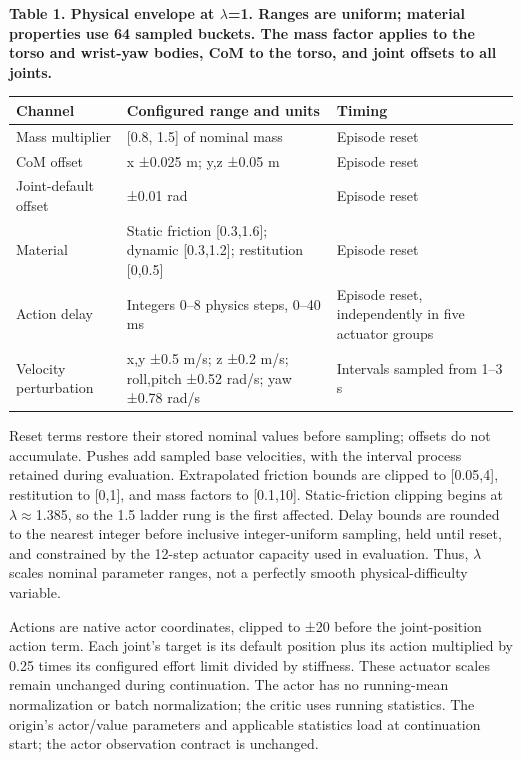 \documentclass[letterpaper,10pt,conference]{ieeeconf}
\begin{document}
\begin{table}[t]\small
\textbf{Table 1. Physical envelope at $\lambda$=1. Ranges are uniform; material properties use 64 sampled buckets. The mass factor applies to the torso and wrist-yaw bodies, CoM to the torso, and joint offsets to all joints.}\par\medskip
\begin{tabularx}{\linewidth}{XXX}\hline
Channel & Configured range and units & Timing \\\hline
Mass multiplier & [0.8, 1.5] of nominal mass & Episode reset \\
CoM offset & x ±0.025 m; y,z ±0.05 m & Episode reset \\
Joint-default offset & ±0.01 rad & Episode reset \\
Material & Static friction [0.3,1.6]; dynamic [0.3,1.2]; restitution [0,0.5] & Episode reset \\
Action delay & Integers 0--8 physics steps, 0--40 ms & Episode reset, independently in five actuator groups \\
Velocity perturbation & x,y ±0.5 m/s; z ±0.2 m/s; roll,pitch ±0.52 rad/s; yaw ±0.78 rad/s & Intervals sampled from 1--3 s \\
\hline\end{tabularx}\end{table}

Reset terms restore their stored nominal values before sampling; offsets do not accumulate. Pushes add sampled base velocities, with the interval process retained during evaluation. Extrapolated friction bounds are clipped to [0.05,4], restitution to [0,1], and mass factors to [0.1,10]. Static-friction clipping begins at $\lambda$$\approx$1.385, so the 1.5 ladder rung is the first affected. Delay bounds are rounded to the nearest integer before inclusive integer-uniform sampling, held until reset, and constrained by the 12-step actuator capacity used in evaluation. Thus, $\lambda$ scales nominal parameter ranges, not a perfectly smooth physical-difficulty variable.

Actions are native actor coordinates, clipped to ±20 before the joint-position action term. Each joint's target is its default position plus its action multiplied by 0.25 times its configured effort limit divided by stiffness. These actuator scales remain unchanged during continuation. The actor has no running-mean normalization or batch normalization; the critic uses running statistics. The origin's actor/value parameters and applicable statistics load at continuation start; the actor observation contract is unchanged.
\end{document}
